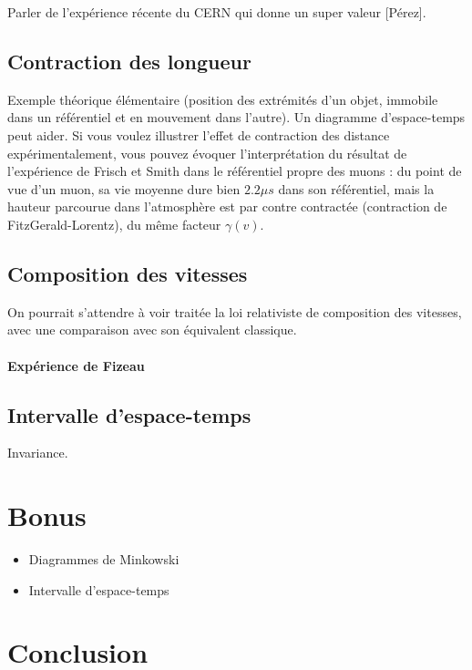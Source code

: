 \documentclass[11pt]{report}
\numberwithin{figure}{section}
\numberwithin{equation}{section}
\numberwithin{table}{section}
\newcommand{\1}{\boldsymbol{1}}
\begin{document}
Parler de l'expérience récente du CERN qui donne un super valeur [Pérez].


\subsection{Contraction des longueur}

Exemple théorique élémentaire (position des extrémités d’un objet, immobile dans un référentiel et en mouvement dans l’autre). Un diagramme d’espace-temps peut aider. Si vous voulez illustrer l’effet de contraction des distance expérimentalement, vous pouvez évoquer l’interprétation du résultat de l’expérience de Frisch et Smith dans le référentiel propre des muons : du point de vue d’un muon, sa vie moyenne dure
bien $2.2\mu  s$ dans son référentiel, mais la hauteur parcourue dans l’atmosphère est par contre contractée (contraction de FitzGerald-Lorentz), du même facteur $\gamma(v)$.

\subsection{Composition des vitesses}

On pourrait s’attendre à voir traitée la loi relativiste de composition des vitesses, avec une comparaison avec son équivalent classique.

\paragraph{Expérience de Fizeau}

\subsection{Intervalle d'espace-temps}

Invariance.

\section*{Bonus}

\begin{itemize}
\item Diagrammes de Minkowski
\item Intervalle d'espace-temps
\end{itemize}

\section*{Conclusion}
\end{document}

